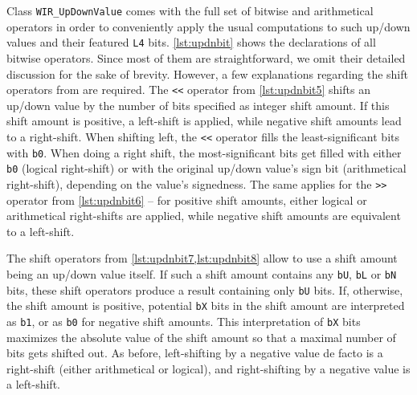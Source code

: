 Class \texttt{WIR\_UpDownValue} comes with the full set of bitwise and arithmetical operators in order to conveniently apply the usual computations to such up/down values and their featured \texttt{L4} bits.
\cref{lst:updnbit} shows the declarations of all bitwise operators.
Since most of them are straightforward, we omit their detailed discussion for the sake of brevity.
However, a few explanations regarding the shift operators from  are required.
The \texttt{<{}<} operator from \cref{lst:updnbit5} shifts an up/down value by the number of bits specified as integer shift amount.
If this shift amount is positive, a left-shift is applied, while negative shift amounts lead to a right-shift.
When shifting left, the \texttt{<{}<} operator fills the least-significant bits with \texttt{b0}.
When doing a right shift, the most-significant bits get filled with either \texttt{b0} (logical right-shift) or with the original up/down value's sign bit (arithmetical right-shift), depending on the value's signedness.
The same applies for the \texttt{>{}>} operator from \cref{lst:updnbit6} -- for positive shift amounts, either logical or arithmetical right-shifts are applied, while negative shift amounts are equivalent to a left-shift.

The shift operators from \cref{lst:updnbit7,lst:updnbit8} allow to use a shift amount being an up/down value itself.
If such a shift amount contains any \texttt{bU}, \texttt{bL} or \texttt{bN} bits, these shift operators produce a result containing only \texttt{bU} bits.
If, otherwise, the shift amount is positive, potential \texttt{bX} bits in the shift amount are interpreted as \texttt{b1}, or as \texttt{b0} for negative shift amounts.
This interpretation of \texttt{bX} bits maximizes the absolute value of the shift amount so that a maximal number of bits gets shifted out.
As before, left-shifting by a negative value de facto is a right-shift (either arithmetical or logical), and right-shifting by a negative value is a left-shift.

